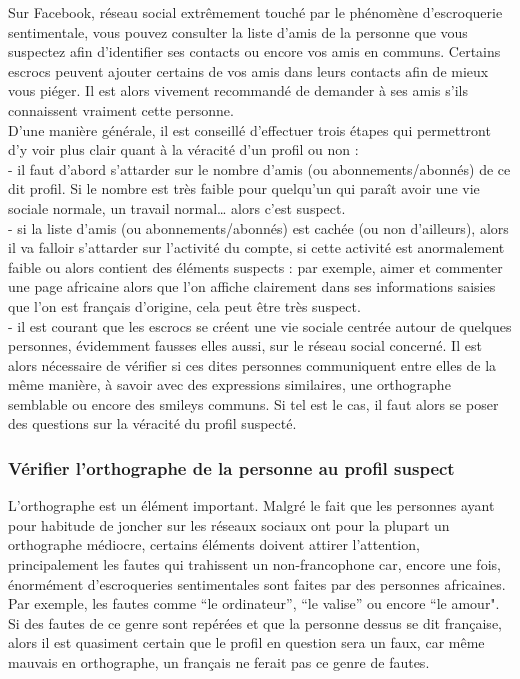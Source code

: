 \documentclass[12pt]{report}
\begin{document}
Sur Facebook, réseau social extrêmement touché par le phénomène d'escroquerie sentimentale, vous pouvez consulter la liste d’amis de la personne que vous suspectez afin d’identifier ses contacts ou encore vos amis en communs. Certains escrocs peuvent ajouter certains de vos amis dans leurs contacts afin de mieux vous piéger. Il est alors vivement recommandé de demander à ses amis s'ils connaissent vraiment cette personne. \\

D'une manière générale, il est conseillé d'effectuer trois étapes qui permettront d'y voir plus clair quant à la véracité d'un profil ou non : \\
- il faut d'abord s'attarder sur le nombre d’amis (ou abonnements/abonnés) de ce dit profil. Si le nombre est très faible pour quelqu’un qui paraît avoir une vie sociale normale, un travail normal… alors c’est suspect.\\
- si la liste d'amis (ou abonnements/abonnés) est cachée (ou non d'ailleurs), alors il va falloir s'attarder sur l'activité du compte, si cette activité est anormalement faible ou alors contient des éléments suspects : par exemple, aimer et commenter une page africaine alors que l'on affiche clairement dans ses informations saisies que l'on est français d'origine, cela peut être très suspect. \\
- il est courant que les escrocs se créent une vie sociale centrée autour de quelques personnes, évidemment fausses elles aussi, sur le réseau social concerné. Il est alors nécessaire de vérifier si ces dites personnes communiquent entre elles de la même manière, à savoir avec des expressions similaires, une orthographe semblable ou encore des smileys communs. Si tel est le cas, il faut alors se poser des questions sur la véracité du profil suspecté. 

\subsubsection{Vérifier l'orthographe de la personne au profil suspect}
L'orthographe est un élément important. Malgré le fait que les personnes ayant pour habitude de joncher sur les réseaux sociaux ont pour la plupart un orthographe médiocre, certains éléments doivent attirer l'attention, principalement les fautes qui trahissent un non-francophone car, encore une fois, énormément d'escroqueries sentimentales sont faites par des personnes africaines. Par exemple, les fautes comme “le ordinateur”, “le valise” ou encore “le amour". Si des fautes de ce genre sont repérées et que la personne dessus se dit française, alors il est quasiment certain que le profil en question sera un faux, car même mauvais en orthographe, un français ne ferait pas ce genre de fautes. 
\end{document}
